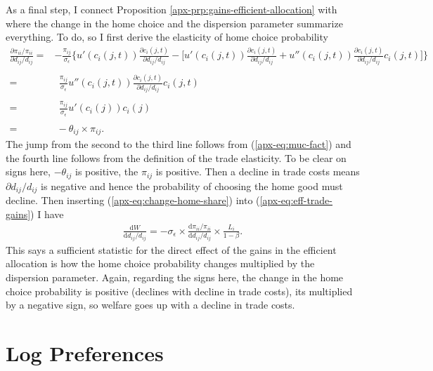 \documentclass[12pt,pdftex]{article}
\begin{document}
\begin{onehalfspacing}
As a final step, I connect Proposition \ref{apx-prp:gains-efficient-allocation} with \citet{arkolakis2012new} where the change in the home choice and the dispersion parameter summarize everything. To do, so I first derive the elasticity of home choice probability
\begin{align}
\frac{\partial \pi_{ii} / \pi_{ii}}{\partial d_{ij} / d_{ij}} =& -\frac{\pi_{ij}}{\sigma_{\epsilon}} \bigg \{ u'(c_{i}(j,t))\frac{\partial c_{i}(j,t)}{\partial d_{ij} / d_{ij}} - \bigg [u'(c_{i}(j,t))\frac{\partial c_{i}(j,t)}{\partial d_{ij} / d_{ij}} + u''(c_{i}(j,t))\frac{\partial c_{i}(j,t)}{\partial d_{ij} / d_{ij}}c_{i}(j,t) \bigg ] \bigg \} \\
\nonumber \\
=& \ \ \frac{\pi_{ij}}{\sigma_{\epsilon}}u''(c_{i}(j,t))\frac{\partial c_{i}(j,t)}{\partial d_{ij} / d_{ij}}c_{i}(j,t) \\
\nonumber \\
=& \ \ \frac{\pi_{ij}}{\sigma_{\epsilon}} u'(c_{i}(j)) c_{i}(j) \\
\nonumber \\
=& \ - \theta_{ij} \times \pi_{ij}. \label{apx-eq:change-home-share}
\end{align}
The jump from the second to the third line follows from (\ref{apx-eq:muc-fact}) and the fourth line follows from the definition of the trade elasticity. To be clear on signs here, $-\theta_{ij}$ is positive, the $\pi_{ij}$ is positive. Then a decline in trade costs means $\partial d_{ij} / d_{ij}$ is negative and hence the probability of choosing the home good must decline.  Then inserting (\ref{apx-eq:change-home-share}) into  (\ref{apx-eq:eff-trade-gains}) I have
\begin{align}
\frac{\mathrm{d} W}{\mathrm{d} d_{ij} / d_{ij}} =  -\sigma_{\epsilon} \times \frac{\mathrm{d} \pi_{ii} / \pi_{ii}}{\mathrm{d} d_{ij} / d_{ij}} \times \frac{L_i}{1 - \beta}.
\label{apx-eq:eff-trade-gains-acr}
\end{align}
This says a sufficient statistic for the direct effect of the gains in the efficient allocation is how the home choice probability changes multiplied by the dispersion parameter. Again, regarding the signs here, the change in the home choice probability is positive (declines with decline in trade costs), its multiplied by a negative sign, so welfare goes up with a decline in trade costs.

\section{Log Preferences}\label{apx-sec:log-preferences}


\end{onehalfspacing}
\end{document}
